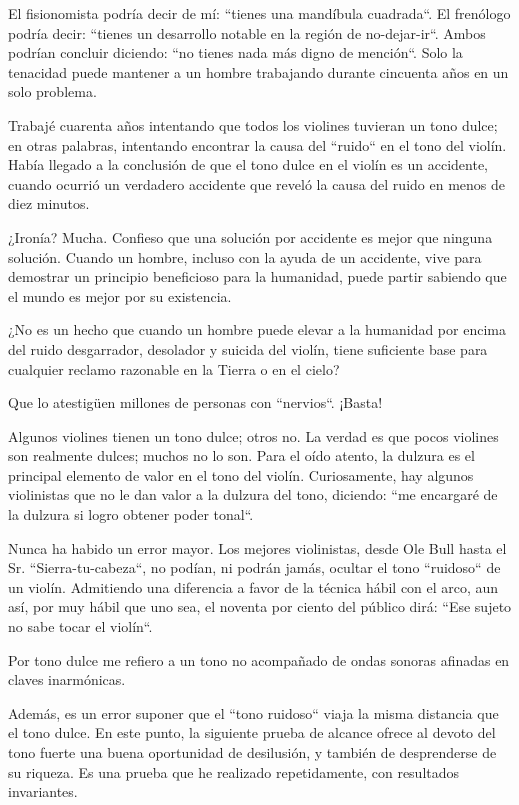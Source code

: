 El fisionomista podría decir de mí: ``tienes una mandíbula cuadrada``. El frenólogo podría decir: ``tienes un desarrollo notable en la región de no-dejar-ir``. Ambos podrían concluir diciendo: ``no tienes nada más digno de mención``. Solo la tenacidad puede mantener a un hombre trabajando durante cincuenta años en un solo problema.

Trabajé cuarenta años intentando que todos los violines tuvieran un tono dulce; en otras palabras, intentando encontrar la causa del ``ruido`` en el tono del violín. Había llegado a la conclusión de que el tono dulce en el violín es un accidente, cuando ocurrió un verdadero accidente que reveló la causa del ruido en menos de diez minutos.

¿Ironía?
Mucha.
Confieso que una solución por accidente es mejor que ninguna solución. Cuando un hombre, incluso con la ayuda de un accidente, vive para demostrar un principio beneficioso para la humanidad, puede partir sabiendo que el mundo es mejor por su existencia.

¿No es un hecho que cuando un hombre puede elevar a la humanidad por encima del ruido desgarrador, desolador y suicida del violín, tiene suficiente base para cualquier reclamo razonable en la Tierra o en el cielo?

Que lo atestigüen millones de personas con ``nervios``.
¡Basta!

Algunos violines tienen un tono dulce; otros no.
La verdad es que pocos violines son realmente dulces; muchos no lo son.
Para el oído atento, la dulzura es el principal elemento de valor en el tono del violín. Curiosamente, hay algunos violinistas que no le dan valor a la dulzura del tono, diciendo: ``me encargaré de la dulzura si logro obtener poder tonal``.

Nunca ha habido un error mayor.
Los mejores violinistas, desde Ole Bull hasta el Sr. ``Sierra-tu-cabeza``, no podían, ni podrán jamás, ocultar el tono ``ruidoso`` de un violín. Admitiendo una diferencia a favor de la técnica hábil con el arco, aun así, por muy hábil que uno sea, el noventa por ciento del público dirá: ``Ese sujeto no sabe tocar el violín``.

Por tono dulce me refiero a un tono no acompañado de ondas sonoras afinadas en claves inarmónicas.

Además, es un error suponer que el ``tono ruidoso`` viaja la misma distancia que el tono dulce. En este punto, la siguiente prueba de alcance ofrece al devoto del tono fuerte una buena oportunidad de desilusión, y también de desprenderse de su riqueza. Es una prueba que he realizado repetidamente, con resultados invariantes.

